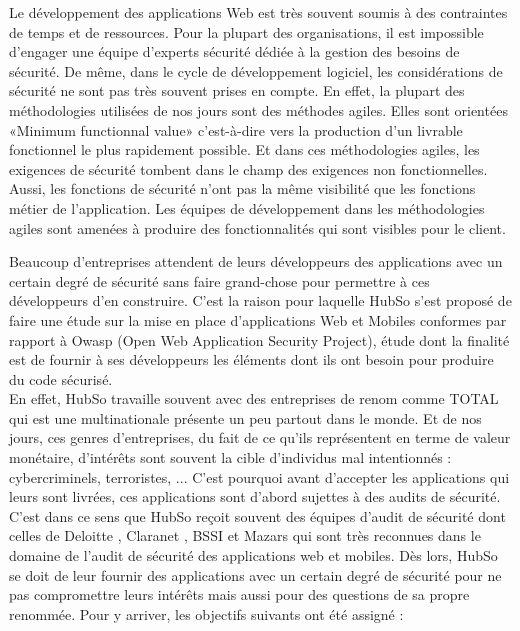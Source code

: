 \begin{itemize}
	\itemtirait Le développement des applications Web est très souvent soumis à des contraintes de temps et de ressources. Pour la plupart des organisations, il est impossible d’engager une équipe d’experts sécurité dédiée à la gestion des besoins de sécurité. De même, dans le cycle de développement logiciel, les considérations de sécurité ne sont pas très souvent prises en compte. En effet, la plupart des méthodologies utilisées de nos jours sont des méthodes agiles. Elles sont orientées «Minimum functionnal value» c'est-à-dire vers la production d'un livrable fonctionnel le plus rapidement possible. Et dans ces méthodologies agiles, les exigences de sécurité tombent dans le champ des exigences non fonctionnelles. Aussi, les fonctions de sécurité n’ont pas la même visibilité que les fonctions métier de l’application. Les équipes de développement dans les méthodologies agiles sont amenées à produire des fonctionnalités qui sont visibles pour le client.
\end{itemize}
Beaucoup d’entreprises attendent de leurs développeurs des applications avec un certain degré de sécurité sans faire grand-chose pour permettre à ces développeurs d’en construire. C'est la raison pour laquelle HubSo s'est proposé de faire une étude sur la mise en place d'applications Web et Mobiles conformes par rapport à Owasp (Open Web Application Security Project),  étude dont la finalité est de fournir à ses développeurs les éléments dont ils ont besoin pour produire du code sécurisé. \\
En effet, HubSo travaille souvent avec des entreprises de renom comme TOTAL qui est une multinationale présente un peu partout dans le monde. Et de nos jours, ces genres d'entreprises, du fait de ce qu'ils représentent en terme de valeur monétaire, d'intérêts sont souvent la cible d'individus mal intentionnés : cybercriminels, terroristes, ... C'est pourquoi avant d'accepter les applications qui leurs sont livrées, ces applications sont d'abord sujettes à des audits de sécurité. C'est dans ce sens que HubSo reçoit souvent des équipes d'audit de sécurité dont celles de Deloitte \cite{deloitte}, Claranet \cite{claranet}, BSSI \cite{bssi} et Mazars \cite{maz} qui sont très reconnues dans le domaine de l'audit de sécurité des applications web et mobiles. Dès lors, HubSo se doit de leur fournir des applications avec un certain degré de sécurité pour ne pas compromettre leurs intérêts mais aussi pour des questions de sa propre renommée.
Pour y arriver, les objectifs suivants ont été assigné :
